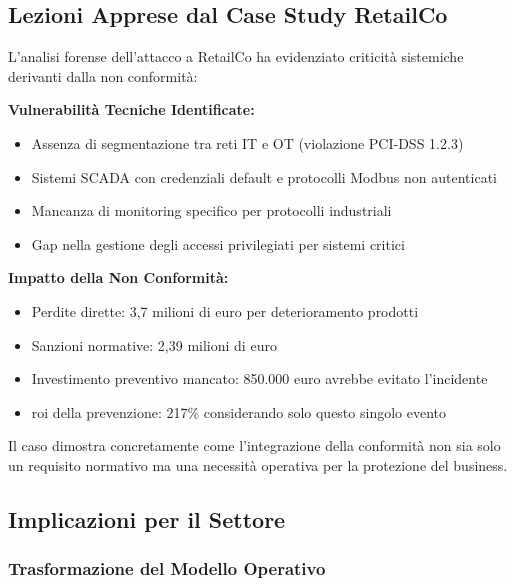 \subsection{\texorpdfstring{Lezioni Apprese dal Case Study RetailCo}{4.9.2 - Lezioni Apprese dal Case Study RetailCo}}

L'analisi forense dell'attacco a RetailCo ha evidenziato criticità sistemiche derivanti dalla non conformità:

\textbf{Vulnerabilità Tecniche Identificate:}
\begin{itemize}
    \item Assenza di segmentazione tra reti IT e OT (violazione PCI-DSS 1.2.3)
    \item Sistemi SCADA con credenziali default e protocolli Modbus non autenticati
    \item Mancanza di monitoring specifico per protocolli industriali
    \item Gap nella gestione degli accessi privilegiati per sistemi critici
\end{itemize}

\textbf{Impatto della Non Conformità:}
\begin{itemize}
    \item Perdite dirette: 3,7 milioni di euro per deterioramento prodotti
    \item Sanzioni normative: 2,39 milioni di euro
    \item Investimento preventivo mancato: 850.000 euro avrebbe evitato l'incidente
    \item \gls{roi} della prevenzione: 217\% considerando solo questo singolo evento
\end{itemize}

Il caso dimostra concretamente come l'integrazione della conformità non sia solo un requisito normativo ma una necessità operativa per la protezione del business.

\subsection{\texorpdfstring{Implicazioni per il Settore}{4.9.3 - Implicazioni per il Settore}}

\subsubsection{\texorpdfstring{Trasformazione del Modello Operativo}{4.9.3.1 - Trasformazione del Modello Operativo}}

